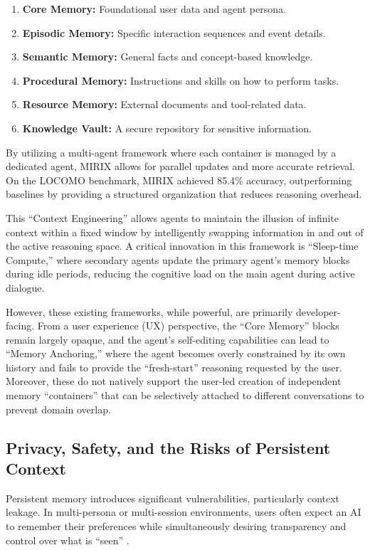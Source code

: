 ﻿\documentclass[12pt,a4paper]{article}
\begin{document}
\begin{enumerate}
    \item \textbf{Core Memory:} Foundational user data and agent persona.
    \item \textbf{Episodic Memory:} Specific interaction sequences and event details.
    \item \textbf{Semantic Memory:} General facts and concept-based knowledge.
    \item \textbf{Procedural Memory:} Instructions and skills on how to perform tasks.
    \item \textbf{Resource Memory:} External documents and tool-related data.
    \item \textbf{Knowledge Vault:} A secure repository for sensitive information.
\end{enumerate}

By utilizing a multi-agent framework where each container is managed by a dedicated agent, MIRIX allows for parallel updates and more accurate retrieval. On the LOCOMO benchmark, MIRIX achieved 85.4\% accuracy, outperforming baselines by providing a structured organization that reduces reasoning overhead.

This ``Context Engineering'' allows agents to maintain the illusion of infinite context within a fixed window by intelligently swapping information in and out of the active reasoning space. A critical innovation in this framework is ``Sleep-time Compute,'' where secondary agents update the primary agent's memory blocks during idle periods, reducing the cognitive load on the main agent during active dialogue.

However, these existing frameworks, while powerful, are primarily developer-facing. From a user experience (UX) perspective, the ``Core Memory'' blocks remain largely opaque, and the agent's self-editing capabilities can lead to ``Memory Anchoring,'' where the agent becomes overly constrained by its own history and fails to provide the ``fresh-start'' reasoning requested by the user. Moreover, these do not natively support the user-led creation of independent memory ``containers'' that can be selectively attached to different conversations to prevent domain overlap.

\subsection{Privacy, Safety, and the Risks of Persistent Context}

Persistent memory introduces significant vulnerabilities, particularly context leakage. In multi-persona or multi-session environments, users often expect an AI to remember their preferences while simultaneously desiring transparency and control over what is ``seen'' \cite{ali2025understanding}.
\end{document}

